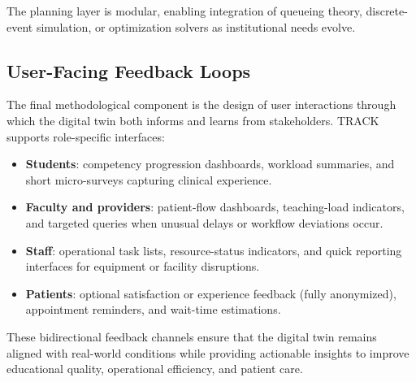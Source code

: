 \documentclass[Afour,sageh,times]{sagej}
\begin{document}
The planning layer is modular, enabling integration of queueing theory, discrete-event simulation, or optimization solvers as institutional needs evolve.

\subsection{User-Facing Feedback Loops}

The final methodological component is the design of user interactions through which the digital twin both informs and learns from stakeholders. TRACK supports role-specific interfaces:

\begin{itemize}[leftmargin=*,itemsep=2pt]
    \item \textbf{Students}: competency progression dashboards, workload summaries, and short micro-surveys capturing clinical experience.
    \item \textbf{Faculty and providers}: patient-flow dashboards, teaching-load indicators, and targeted queries when unusual delays or workflow deviations occur.
    \item \textbf{Staff}: operational task lists, resource-status indicators, and quick reporting interfaces for equipment or facility disruptions.
    \item \textbf{Patients}: optional satisfaction or experience feedback (fully anonymized), appointment reminders, and wait-time estimations.
\end{itemize}

These bidirectional feedback channels ensure that the digital twin remains aligned with real-world conditions while providing actionable insights to improve educational quality, operational efficiency, and patient care.


\newpage
\end{document}
